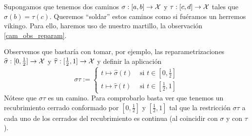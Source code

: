 \begin{obs}
	\label{cam_obs_pegado}
	Supongamos que tenemos dos caminos $\sigma:[a,b]\to\mathcal{X}$ y $\tau:[c,d]\to\mathcal{X}$ tales que $\sigma(b)=\tau(c)$. Queremos ``soldar'' estos caminos como si fuéramos un herremos vikingo. Para ello, haremos uso de nuestro martillo, la observación \ref{cam_obs_reparam}.
	
	Observemos que bastaría con tomar, por ejemplo, las reparametrizaciones $\widehat{\sigma}:[0,\frac{1}{2}]\to\mathcal{X}$ y $\widehat{\tau}:[\frac{1}{2},1]\to\mathcal{X}$ y definir la aplicación
	\begin{equation*}
		\sigma\tau:=\left\{\begin{array}{cc}
			t\mapsto \widehat{\sigma}(t)&\text{ si }t\in[0,\frac{1}{2}]\\
			t\mapsto \widehat{\tau}(t)&\text{ si }t\in[\frac{1}{2},1]
		\end{array}\right.
	\end{equation*}
	Nótese que $\sigma\tau$ es un camino. Para comprobarlo basta ver que tenemos un recubrimiento cerrado conformado por $[0,\frac{1}{2}]$ y $[\frac{1}{2},1]$ tal que la restricción $\sigma\tau$ a cada uno de los cerrados del recubrimiento es continua (al coincidir con $\sigma$ y con $\tau$).
\end{obs}
